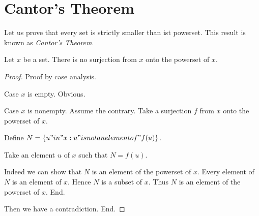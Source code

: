 \documentclass{article}
\begin{document}

  \section*{Cantor's Theorem}

  Let us prove that every set is strictly smaller than ist powerset. This result
  is known as \textit{Cantor's Theorem}.

  \begin{forthel}

    \begin{theorem}[Cantor]
      Let $x$ be a set. There is no surjection from $x$ onto the powerset of $x$.
    \end{theorem}

    \begin{proof}
      Proof by case analysis.

      Case $x$ is empty. Obvious.

      Case $x$ is nonempty.
        Assume the contrary. Take a surjection $f$ from $x$ onto the powerset of
        $x$.

        Define $N = \{ u "in" x : u "is not an element of" f(u) \}$.

        Take an element $u$ of $x$ such that $N = f(u)$.

        Indeed we can show that $N$ is an element of the powerset of $x$.
          Every element of $N$ is an element of $x$. Hence $N$ is a subset of
          $x$. Thus $N$ is an element of the powerset of $x$.
        End.

        Then we have a contradiction.
      End.
    \end{proof}
  \end{forthel}
\end{document}
